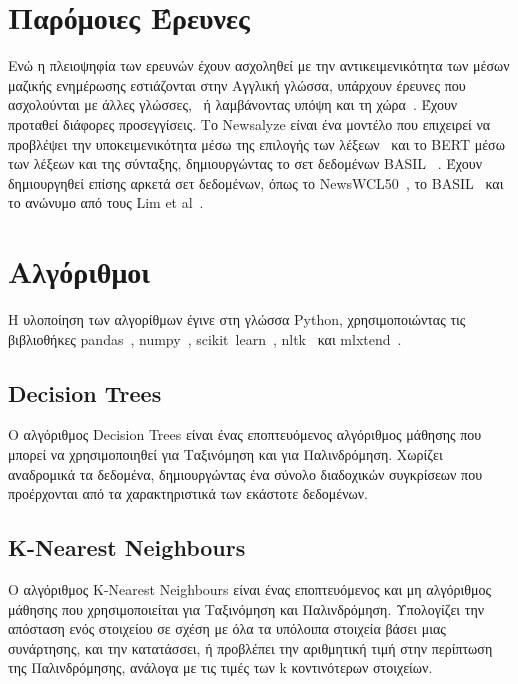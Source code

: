 \documentclass[a4paper, 12pt]{article}
\begin{document}
\section{Παρόμοιες Έρευνες}

Ενώ η πλειοψηφία των ερευνών έχουν ασχοληθεί με την αντικειμενικότητα των μέσων μαζικής ενημέρωσης εστιάζονται στην Αγγλική γλώσσα, υπάρχουν έρευνες που ασχολούνται με άλλες γλώσσες,~\cite{spinde-2020} ή λαμβάνοντας υπόψη και τη χώρα~\cite{morstatter-2018}. Έχουν προταθεί διάφορες προσεγγίσεις. Το Newsalyze  είναι ένα μοντέλο που επιχειρεί να προβλέψει την υποκειμενικότητα μέσω της επιλογής των λέξεων~\cite{hambord-2019} και το BERT  μέσω των λέξεων και της σύνταξης, δημιουργώντας το σετ δεδομένων BASIL~\cite{fan-2019} . Έχουν δημιουργηθεί επίσης αρκετά σετ δεδομένων, όπως το NewsWCL50~\cite{hamborg-2019auto}, το BASIL~\cite{fan-2019}  και το ανώνυμο από τους Lim et al~\cite{lim-2018}.

\section{Αλγόριθμοι}

Η υλοποίηση των αλγορίθμων έγινε στη γλώσσα Python, χρησιμοποιώντας τις βιβλιοθήκες pandas~\cite{pandas}, numpy~\cite{numpy}, scikit~learn~\cite{scikit-learn}, nltk~\cite{nltk} και mlxtend~\cite{mlxtend}.

\subsection{Decision Trees}
Ο αλγόριθμος Decision Trees είναι ένας εποπτευόμενος αλγόριθμος μάθησης που μπορεί να χρησιμοποιηθεί για Ταξινόμηση και για Παλινδρόμηση. Χωρίζει αναδρομικά τα δεδομένα, δημιουργώντας ένα σύνολο διαδοχικών συγκρίσεων που προέρχονται από τα χαρακτηριστικά των εκάστοτε δεδομένων.~\cite{loh-2011}~\cite{sklearn-dt}

\subsection{K-Nearest Neighbours}
Ο αλγόριθμος K-Nearest Neighbours είναι ένας εποπτευόμενος και μη αλγόριθμος μάθησης που χρησιμοποιείται για Ταξινόμηση και Παλινδρόμηση. Υπολογίζει την απόσταση ενός στοιχείου σε σχέση με όλα τα υπόλοιπα στοιχεία βάσει μιας συνάρτησης, και την κατατάσσει, ή προβλέπει την αριθμητική τιμή στην περίπτωση της Παλινδρόμησης, ανάλογα με τις τιμές των k κοντινότερων στοιχείων.~\cite{sklearn-knn}
\end{document}

